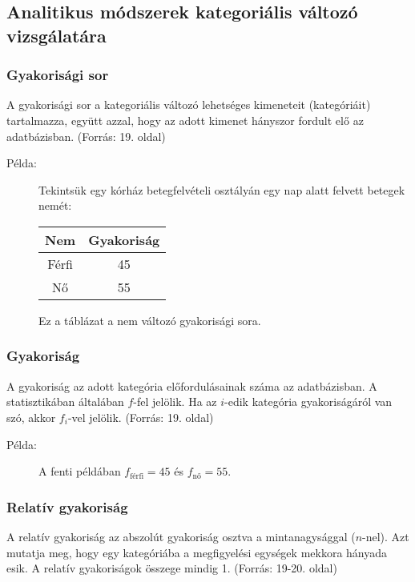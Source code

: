 \documentclass[a4paper,12pt]{article}
\begin{document}
\subsection{Analitikus módszerek kategoriális változó vizsgálatára}

\subsubsection{Gyakorisági sor}
A gyakorisági sor a kategoriális változó lehetséges kimeneteit (kategóriáit) tartalmazza, együtt azzal, hogy az adott kimenet hányszor fordult elő az adatbázisban.
(Forrás: 19. oldal)

\begin{description}
\item[Példa:] Tekintsük egy kórház betegfelvételi osztályán egy nap alatt felvett betegek nemét:
\begin{center}
\begin{tabular}{|c|c|}
\hline
Nem & Gyakoriság \\
\hline
Férfi & 45 \\
Nő & 55 \\
\hline
\end{tabular}
\end{center}
Ez a táblázat a nem változó gyakorisági sora.
\end{description}

\subsubsection{Gyakoriság}
A gyakoriság az adott kategória előfordulásainak száma az adatbázisban. A statisztikában általában $f$-fel jelölik. Ha az $i$-edik kategória gyakoriságáról van szó, akkor $f_i$-vel jelölik.
(Forrás: 19. oldal)

\begin{description}
\item[Példa:] A fenti példában $f_{\text{férfi}} = 45$ és $f_{\text{nő}} = 55$.
\end{description}

\subsubsection{Relatív gyakoriság}
A relatív gyakoriság az abszolút gyakoriság osztva a mintanagysággal ($n$-nel). Azt mutatja meg, hogy egy kategóriába a megfigyelési egységek mekkora hányada esik. A relatív gyakoriságok összege mindig 1.
(Forrás: 19-20. oldal)
\end{document}
